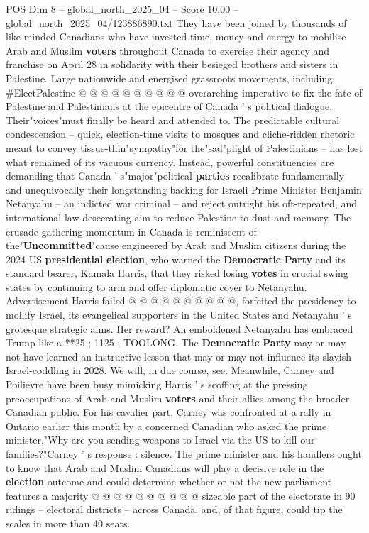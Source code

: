 \begin{textsample}{POS Dim 8 – global\_north\_2025\_04 – Score 10.00 – global\_north\_2025\_04/123886890.txt}
They have been joined by thousands of like-minded Canadians who have invested time, money and energy to mobilise Arab and Muslim \textbf{voters} throughout Canada to exercise their agency and franchise on April 28 in solidarity with their besieged brothers and sisters in Palestine.
Large nationwide and energised grassroots movements, including \#ElectPalestine @ @ @ @ @ @ @ @ @ @ overarching imperative to fix the fate of Palestine and Palestinians at the epicentre of Canada ' s political dialogue.
Their"voices"must finally be heard and attended to.
The predictable cultural condescension -- quick, election-time visits to mosques and cliche-ridden rhetoric meant to convey tissue-thin"sympathy"for the"sad"plight of Palestinians -- has lost what remained of its vacuous currency.
Instead, powerful constituencies are demanding that Canada ' s"major"political \textbf{parties} recalibrate fundamentally and unequivocally their longstanding backing for Israeli Prime Minister Benjamin Netanyahu -- an indicted war criminal -- and reject outright his oft-repeated, and international law-desecrating aim to reduce Palestine to dust and memory.
The crusade gathering momentum in Canada is reminiscent of the"\textbf{Uncommitted}"cause engineered by Arab and Muslim citizens during the 2024 US \textbf{presidential} \textbf{election}, who warned the \textbf{Democratic} \textbf{Party} and its standard bearer, Kamala Harris, that they risked losing \textbf{votes} in crucial swing states by continuing to arm and offer diplomatic cover to Netanyahu.
Advertisement Harris failed @ @ @ @ @ @ @ @ @ @, forfeited the presidency to mollify Israel, its evangelical supporters in the United States and Netanyahu ' s grotesque strategic aims.
Her reward?
An emboldened Netanyahu has embraced Trump like a **25 ; 1125 ; TOOLONG.
The \textbf{Democratic} \textbf{Party} may or may not have learned an instructive lesson that may or may not influence its slavish Israel-coddling in 2028.
We will, in due course, see.
Meanwhile, Carney and Poilievre have been busy mimicking Harris ' s scoffing at the pressing preoccupations of Arab and Muslim \textbf{voters} and their allies among the broader Canadian public.
For his cavalier part, Carney was confronted at a rally in Ontario earlier this month by a concerned Canadian who asked the prime minister,"Why are you sending weapons to Israel via the US to kill our families?"Carney ' s response : silence.
The prime minister and his handlers ought to know that Arab and Muslim Canadians will play a decisive role in the \textbf{election} outcome and could determine whether or not the new parliament features a majority @ @ @ @ @ @ @ @ @ @ sizeable part of the electorate in 90 ridings -- electoral districts -- across Canada, and, of that figure, could tip the scales in more than 40 seats.

\end{textsample}
